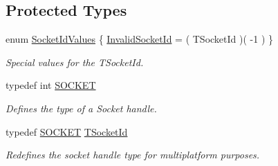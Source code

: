 \subsection*{Protected Types}
\begin{DoxyCompactItemize}
\item 
enum \hyperlink{class_socket_base_a1441f12307a40913930ccbb8baf953bb}{Socket\-Id\-Values} \{ \hyperlink{class_socket_base_a1441f12307a40913930ccbb8baf953bbaa1aa134affcd450ff233364a61bcd5b0}{Invalid\-Socket\-Id} = ( T\-Socket\-Id )( -\/1 )
 \}
\begin{DoxyCompactList}\small\item\em Special values for the T\-Socket\-Id. \end{DoxyCompactList}\item 
typedef int \hyperlink{class_socket_base_aa1bd9ff0bcf59292806575e0abbe3829}{S\-O\-C\-K\-E\-T}
\begin{DoxyCompactList}\small\item\em Defines the type of a Socket handle. \end{DoxyCompactList}\item 
typedef \hyperlink{class_socket_base_aa1bd9ff0bcf59292806575e0abbe3829}{S\-O\-C\-K\-E\-T} \hyperlink{class_socket_base_aad53265037e46768af4d6a0c2ebed277}{T\-Socket\-Id}
\begin{DoxyCompactList}\small\item\em Redefines the socket handle type for multiplatform purposes. \end{DoxyCompactList}\end{DoxyCompactItemize}
